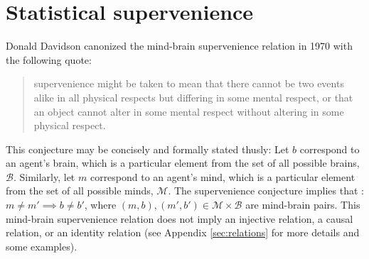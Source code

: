 \documentclass{article}
\newcommand{\mB}{\mathcal{B}}
\newcommand{\mM}{\mathcal{M}}
\providecommand{\mc}[1]{\mathcal{#1}}
\begin{document}
\section{Statistical supervenience} %
\label{sec:preliminaries}



Donald Davidson canonized the mind-brain supervenience relation in 1970 with the following quote: \cite{Davidson70}
\begin{quotation}
\noindent supervenience might be taken to mean that there cannot be two events alike in all physical respects but differing in some mental respect, or that an object cannot alter in some mental respect without altering in some physical respect.
\end{quotation}
This conjecture may be concisely and formally stated thusly: Let $b$ correspond to an agent's brain, which is a particular element from the set of all possible brains, $\mB$. %
Similarly, let $m$ correspond to an agent's mind, which is a particular element from the set of all possible minds, $\mM$.  %
The supervenience conjecture implies that%
: $m \neq m' \implies b \neq b'$, where $(m,b), (m',b') \in \mc{M} \times \mc{B}$ are mind-brain pairs.  This mind-brain supervenience relation does not imply an injective relation, a causal relation, or an identity relation (see Appendix \ref{sec:relations} for more details and some examples).
\end{document}
